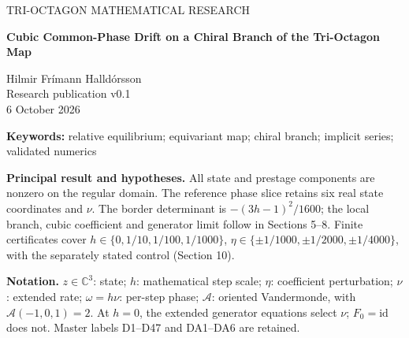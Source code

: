 \documentclass[11pt,a4paper]{article}
\begin{document}
\begin{center}
{\small\color{MidnightBlue} TRI-OCTAGON MATHEMATICAL RESEARCH}\\[7mm]
{\LARGE\bfseries Cubic Common-Phase Drift on a Chiral Branch of the Tri-Octagon Map\par}\vspace{5mm}
{\large Hilmir Frímann Halldórsson}\\[3mm]
Research publication v0.1\\6 October 2026
\end{center}
\begin{abstract}
We explain a nonzero common-phase drift on a locally continued chiral branch of the native Tri-Octagon map. For \((\epsilon,g,\lambda)=h(1,1/6,1/30)\), \(k=(1-\eta,1,1+\eta)\) and \(0\le h\le1/4\), a seven-real-variable bordered system isolates the branch from \(z_j^*=2^{-1/2}e^{2\pi ij/3}\). The extended rate satisfies \(\nu_+=2c_+(h)\eta^3+O(\eta^5)\), with \(c_+(h)=\sqrt3(33h^2-240h+688)/(6(1-3h)^3)>0\). The full state jet, symmetry divisibility and reference determinant give the coefficient proof. Retained interval continuation certifies a finite ladder at four step values, separately from the local analytic theorem. Common-phase-invariant coherences remain stationary, and the nonzero generator rate excludes a specified invariant-potential pure-gradient representation. The reference is a saddle; attraction and physical phase calibration are not established. The result concerns native complex-state dynamics and supplies no spatial rotation law.
\end{abstract}
\noindent\textbf{Keywords:} relative equilibrium; equivariant map; chiral branch; implicit series; validated numerics\par
\vspace{3mm}
\textbf{Principal result and hypotheses.}
All state and prestage components are nonzero on the regular domain.
The reference phase slice retains six real state coordinates and \(\nu\).
The border determinant is \(-(3h-1)^2/1600\); the local branch, cubic coefficient and generator limit follow in Sections 5--8.
Finite certificates cover \(h\in\{0,1/10,1/100,1/1000\}\), \(\eta\in\{\pm1/1000,\pm1/2000,\pm1/4000\}\), with the separately stated control (Section 10).

\textbf{Notation.} \(z\in\mathbb C^3\): state; \(h\): mathematical step scale; \(\eta\): coefficient perturbation; \(\nu\): extended rate; \(\omega=h\nu\): per-step phase; \(\mathcal A\): oriented Vandermonde, with \(\mathcal A(-1,0,1)=2\). At \(h=0\), the extended generator equations select \(\nu\); \(F_0=\mathrm{id}\) does not. Master labels D1--D47 and DA1--DA6 are retained.
\clearpage
\begingroup\small\setcounter{tocdepth}{1}\tableofcontents\endgroup
\clearpage
\end{document}
